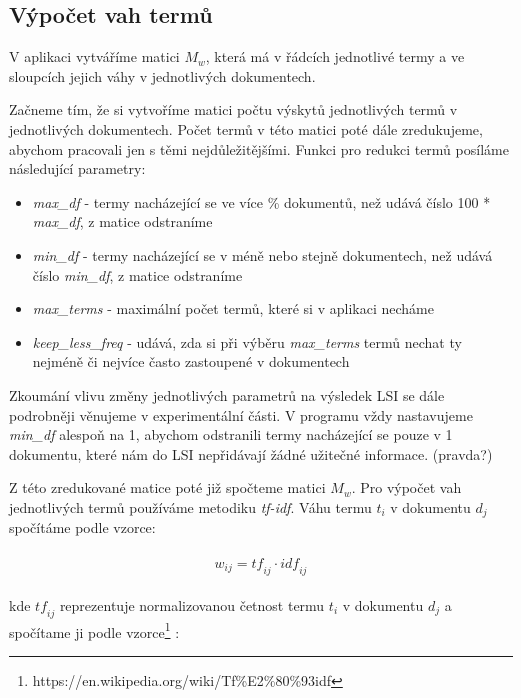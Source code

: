 \documentclass[11pt]{scrartcl} %
\begin{document}
\subsection{Výpočet vah termů}
V aplikaci vytváříme matici $M_w$, která má v řádcích jednotlivé termy a ve sloupcích jejich váhy v jednotlivých dokumentech.

\bigskip 

Začneme tím, že si vytvoříme matici počtu výskytů jednotlivých termů v jednotlivých dokumentech. Počet termů v této matici poté dále zredukujeme, abychom pracovali jen s těmi nejdůležitějšími. Funkci pro redukci termů posíláme následující parametry:
\begin{itemize}
	\item \emph{max\_df} - termy nacházející se ve více \% dokumentů, než udává číslo 100 * \emph{max\_df}, z matice odstraníme
	\item \emph{min\_df} - termy nacházející se v méně nebo stejně dokumentech, než udává číslo \emph{min\_df}, z matice odstraníme
	\item \emph{max\_terms} - maximální počet termů, které si v aplikaci necháme
	\item \emph{keep\_less\_freq} - udává, zda si při výběru \emph{max\_terms} termů nechat ty nejméně či nejvíce často zastoupené v dokumentech  
\end{itemize}

\bigskip 

Zkoumání vlivu změny jednotlivých parametrů na výsledek LSI se dále podrobněji věnujeme v experimentální části. V programu vždy nastavujeme \emph{min\_df} alespoň na 1, abychom odstranili termy nacházející se pouze v 1 dokumentu, které nám do LSI nepřidávají žádné užitečné informace. (pravda?)

\bigskip

Z této zredukované matice poté již spočteme matici $M_w$. Pro výpočet vah jednotlivých termů používáme metodiku \emph{tf-idf}. Váhu termu $t_i$ v dokumentu $d_j$ spočítáme podle vzorce:

\begin{align}
	\begin{split}
		\mathit{w_{ij} = tf_{ij} \cdot idf_{ij}}
	\end{split}					
\end{align}

kde $\mathit{tf_{ij}}$ reprezentuje normalizovanou četnost termu $t_i$ v dokumentu $d_j$ a spočítame ji podle vzorce\footnote{https://en.wikipedia.org/wiki/Tf\%E2\%80\%93idf} :
\end{document}

